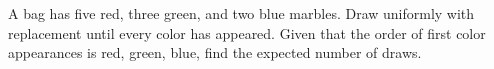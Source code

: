 A bag has five red, three green, and two blue marbles. Draw uniformly with replacement until every color has appeared. Given that the order of first color appearances is red, green, blue, find the expected number of draws.
